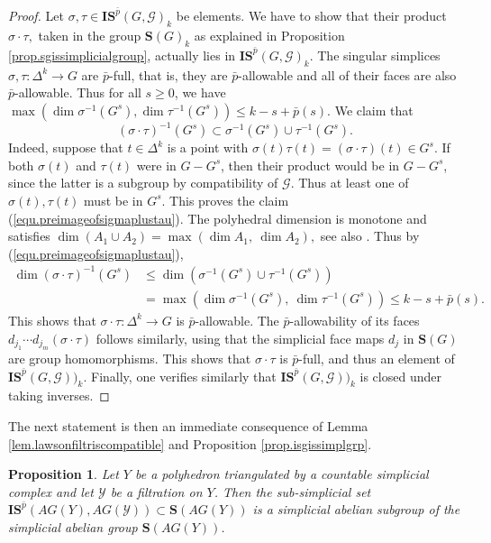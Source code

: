 \documentclass{amsart}
\newtheorem{prop}[thm]{Proposition}
\theoremstyle{definition}
\theoremstyle{remark}
\newcommand {\Ga}    {\ensuremath{\mbox{$\mathcal{G}$}}}
\newcommand {\Ya}    {\ensuremath{\mathcal{Y}}}
\newcommand {\bp}    {{\ensuremath{\bar{p}}}}
\newcommand {\sS}    {\mathbf{S}}
\newcommand {\sIS}   {\mathbf{IS}}
\begin{document}
\begin{proof}
Let $\sigma, \tau \in \sIS^\bp (G, \Ga)_k$ be elements. 
We have to show that their product $\sigma \cdot \tau,$ taken in the group
$\sS (G)_k$ as explained in Proposition \ref{prop.sgissimplicialgroup}, 
actually lies in $\sIS^\bp (G, \Ga)_k$.
The singular simplices $\sigma, \tau: \Delta^k \to G$
are $\bp$-full, that is, they are $\bp$-allowable and all of their
faces are also $\bp$-allowable.
Thus for all $s\geq 0$, we have
$\max (\dim \sigma^{-1} (G^s), \dim \tau^{-1} (G^s)) \leq k - s + \bp (s).$
 We claim that 
\begin{equation} \label{equ.preimageofsigmaplustau} 
(\sigma \cdot \tau)^{-1} (G^s)
  \subset \sigma^{-1} (G^s) \cup \tau^{-1} (G^s). 
\end{equation}  
Indeed, suppose that $t\in \Delta^k$ is a point with
$\sigma (t) \tau (t) = (\sigma \cdot \tau)(t) \in G^s.$
If both $\sigma (t)$ and $\tau (t)$ were in $G-G^s$,
then their product would be in $G-G^s$, since the latter
is a subgroup by compatibility of $\Ga$.
Thus at least one of $\sigma (t), \tau (t)$ must be in $G^s$.
This proves the claim (\ref{equ.preimageofsigmaplustau}).
The polyhedral dimension is monotone and satisfies
$\dim (A_1 \cup A_2) = \max (\dim A_1,~ \dim A_2),$
see also \cite[p. 9]{chataurst}.
Thus by (\ref{equ.preimageofsigmaplustau}),
\begin{align*}
\dim (\sigma \cdot \tau)^{-1} (G^s)
&\leq \dim (\sigma^{-1} (G^s) \cup \tau^{-1} (G^s)) \\
&= \max (\dim \sigma^{-1} (G^s),~ \dim \tau^{-1} (G^s)) 
    \leq k-s+ \bp (s).
\end{align*}
This shows that $\sigma \cdot \tau: \Delta^k \to G$ is $\bp$-allowable.
The $\bp$-allowability of its faces
$d_{j_1} \cdots d_{j_m} (\sigma \cdot \tau)$
follows similarly, using
that the simplicial face maps $d_j$ in $\sS (G)$ are group homomorphisms.
This shows that $\sigma \cdot \tau$ is $\bp$-full, and thus
an element of 
$\sIS^\bp (G, \Ga))_k$.
Finally, one verifies similarly that $\sIS^\bp (G, \Ga))_k$ is closed under taking
inverses.
\end{proof}

The next statement is then an immediate consequence of
Lemma \ref{lem.lawsonfiltriscompatible} and Proposition \ref{prop.isgissimplgrp}.
\begin{prop} \label{prop.isagyissimplabgrp}
Let $Y$ be a polyhedron triangulated by a countable simplicial complex
and let $\Ya$ be a filtration on $Y$.
Then the sub-simplicial set
$\sIS^\bp (AG(Y), AG(\Ya)) \subset \sS (AG(Y))$
is a simplicial abelian subgroup of the simplicial abelian group $\sS (AG(Y))$.
\end{prop}
\end{document}
